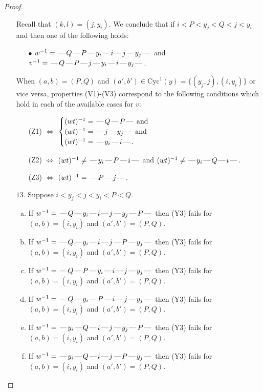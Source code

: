 \documentclass[10pt]{article}
\theoremstyle{definition}
\theoremstyle{definition}
\def\dash{\text{\hspace{0.5mm}---\hspace{0.5mm}}}
\def\Cyc{\mathrm{Cyc}}
\begin{document}
\begin{proof}
\begin{enumerate}
\begin{enumerate}[(a)]
\end{enumerate}
Recall that $(k,l) = (j,y_i)$.
We conclude that if $i < P < y_j < Q < j < y_i$ and then one of the following holds:
\begin{enumerate}
\item[$\bullet$] $w^{-1} = \dash Q\dash P\dash y_i\dash i\dash j\dash y_j\dash $ and $v^{-1} = \dash Q\dash P\dash j\dash y_i\dash i\dash y_j\dash $.
\end{enumerate}
When $(a,b)= (P,Q)$ and $(a',b')\in \Cyc^1(y)=\{(y_j,j),(i,y_i)\}$ or vice versa,
properties (V1)-(V3) correspond to the following conditions which hold in
each of the available cases for $v$:
\begin{enumerate}
\item[](Z1) $\Leftrightarrow$ $\begin{cases}\text{$(wt)^{-1} = \dash Q \dash P \dash$}\text{ and }\\
\text{$(wt)^{-1} = \dash j \dash y_j \dash$}\text{ and }\\
\text{$(wt)^{-1} = \dash y_i \dash i \dash$}.\end{cases}$
\item[](Z2) $\Leftrightarrow$ $(wt)^{-1} \neq \dash y_i \dash P \dash i \dash$ and $(wt)^{-1}\neq \dash y_i \dash Q \dash i \dash$.
\item[](Z3) $\Leftrightarrow$ $(wt)^{-1} = \dash P \dash j \dash$.
\end{enumerate}
\item[$13$.] Suppose $i < y_j < j < y_i < P < Q$.
\begin{enumerate}[(a)]
\item If $w^{-1} = \dash Q\dash y_i\dash i\dash j\dash y_j\dash P\dash $ then (Y3) fails for $(a,b)=(i,y_i)$ and $(a',b')=(P,Q)$.
\item If $w^{-1} = \dash Q\dash y_i\dash i\dash j\dash P\dash y_j\dash $ then (Y3) fails for $(a,b)=(i,y_i)$ and $(a',b')=(P,Q)$.
\item If $w^{-1} = \dash Q\dash P\dash y_i\dash i\dash j\dash y_j\dash $ then (Y3) fails for $(a,b)=(i,y_i)$ and $(a',b')=(P,Q)$.
\item If $w^{-1} = \dash Q\dash y_i\dash P\dash i\dash j\dash y_j\dash $ then (Y3) fails for $(a,b)=(i,y_i)$ and $(a',b')=(P,Q)$.
\item If $w^{-1} = \dash y_i\dash Q\dash i\dash j\dash y_j\dash P\dash $ then (Y3) fails for $(a,b)=(i,y_i)$ and $(a',b')=(P,Q)$.
\item If $w^{-1} = \dash y_i\dash Q\dash i\dash j\dash P\dash y_j\dash $ then (Y3) fails for $(a,b)=(i,y_i)$ and $(a',b')=(P,Q)$.

\end{enumerate}
\end{enumerate}
\end{proof}
\end{document}
